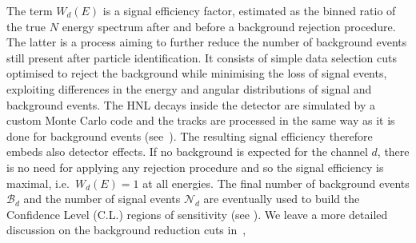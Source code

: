 The term $W_d(E)$ is a signal efficiency factor, estimated as the binned ratio of the true $N$ energy spectrum after %
and before a background rejection procedure.
The latter is a process aiming to further reduce the number of background events still present after particle identification.
It consists of simple data selection cuts optimised to reject the background while minimising the loss of signal events, %
exploiting differences in the energy and angular distributions of signal and background events.
The HNL decays inside the detector are simulated by a custom Monte Carlo code and the tracks are processed in the same way %
as it is done for background events (see~).
The resulting signal efficiency therefore embeds also detector effects.
If no background is expected for the channel $d$, there is no need for applying any rejection procedure %
and so the signal efficiency is maximal, i.e.\ $W_d(E) = 1$ at all energies.
The final number of background events $\mathcal{B}_d$ and the number of signal events $\mathcal{N}_d$ are %
eventually used to build the Confidence Level (C.L.) regions of sensitivity (see ).
%
We leave a more detailed discussion on the background reduction cuts in~, %
